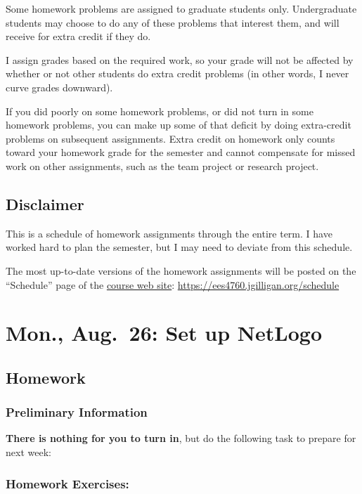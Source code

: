 \documentclass[
]{article}
\begin{document}
Some homework problems are assigned to graduate students only.
Undergraduate students may choose to do any of these problems that
interest them, and will receive for extra credit if they do.

I assign grades based on the required work, so your grade will not be
affected by whether or not other students do extra credit problems (in
other words, I never curve grades downward).

If you did poorly on some homework problems, or did not turn in some
homework problems, you can make up some of that deficit by doing
extra-credit problems on subsequent assignments. Extra credit on
homework only counts toward your homework grade for the semester and
cannot compensate for missed work on other assignments, such as the team
project or research project.

\subsection{Disclaimer}\label{disclaimer}

This is a schedule of homework assignments through the entire term. I
have worked hard to plan the semester, but I may need to deviate from
this schedule.

The most up-to-date versions of the homework assignments will be posted
on the ``Schedule'' page of the
\href{https://ees4760.jgilligan.org/schedule}{course web site}:
\url{https://ees4760.jgilligan.org/schedule}

\section{Mon., Aug.~26: Set up
NetLogo}\label{mon.-aug.-26-set-up-netlogo}

\subsection{Homework}\label{homework}

\subsubsection{Preliminary Information}\label{preliminary-information}

\textbf{There is nothing for you to turn in}, but do the following task
to prepare for next week:

\subsubsection{Homework Exercises:}\label{homework-exercises}
\end{document}
